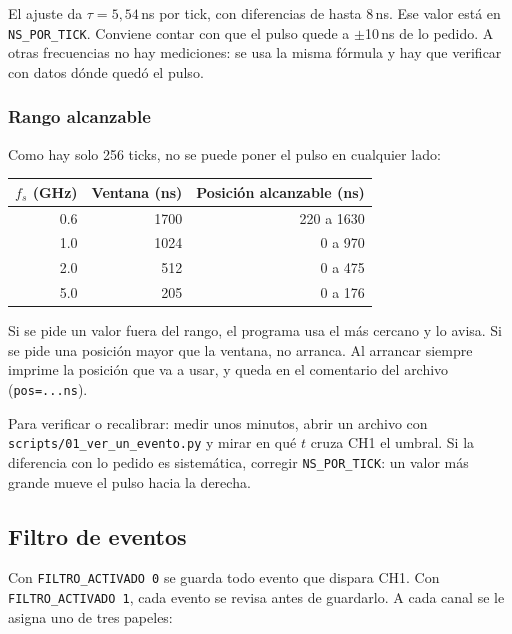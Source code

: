 \documentclass[11pt,a4paper]{article}
\newcommand{\code}[1]{\texttt{#1}}
\begin{document}
El ajuste da $\tau = 5{,}54$\,ns por tick, con diferencias de hasta 8\,ns. Ese valor
está en \code{NS\_POR\_TICK}. Conviene contar con que el pulso quede a $\pm$10\,ns de
lo pedido. A otras frecuencias no hay mediciones: se usa la misma fórmula y hay que
verificar con datos dónde quedó el pulso.

\subsubsection*{Rango alcanzable}

Como hay solo 256 ticks, no se puede poner el pulso en cualquier lado:

\begin{center}
\begin{tabular}{rrr}
\toprule
$f_s$ (GHz) & Ventana (ns) & Posición alcanzable (ns) \\
\midrule
0.6 & 1700 & 220 a 1630 \\
1.0 & 1024 & 0 a 970 \\
2.0 & 512 & 0 a 475 \\
5.0 & 205 & 0 a 176 \\
\bottomrule
\end{tabular}
\end{center}

Si se pide un valor fuera del rango, el programa usa el más cercano y lo avisa. Si
se pide una posición mayor que la ventana, no arranca. Al arrancar siempre imprime
la posición que va a usar, y queda en el comentario del archivo (\code{pos=...ns}).

\begin{nota}
Para verificar o recalibrar: medir unos minutos, abrir un archivo con
\code{scripts/01\_ver\_un\_evento.py} y mirar en qué $t$ cruza CH1 el umbral. Si la
diferencia con lo pedido es sistemática, corregir \code{NS\_POR\_TICK}: un valor más
grande mueve el pulso hacia la derecha.
\end{nota}

\subsection{Filtro de eventos}
\label{sec:filtro}

Con \code{FILTRO\_ACTIVADO 0} se guarda todo evento que dispara CH1. Con
\code{FILTRO\_ACTIVADO 1}, cada evento se revisa antes de guardarlo. A cada canal se
le asigna uno de tres papeles:
\end{document}
